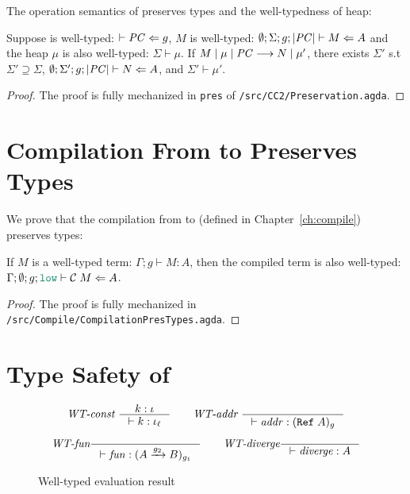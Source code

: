 The operation semantics of \CC preserves types and the well-typedness of heap:

\begin{theorem}[Preservation]
\label{thm:preservation}
Suppose \PC is well-typed:  $\vdash \mathit{PC} \Leftarrow g$,
$M$ is well-typed: $\emptyset ; \Sigma ; g ; |\mathit{PC}| \vdash M \Leftarrow A$
and the heap $\mu$ is also well-typed: $\Sigma \vdash \mu$.
If ${M}\mid{\mu}\mid{\ensuremath{\mathit{PC}}}\longrightarrow{N}\mid{\mu'}$, there exists $\Sigma'$ s.t
$\Sigma' \supseteq \Sigma$, $\emptyset ; \Sigma' ; g ; |\mathit{PC}| \vdash N \Leftarrow A$,
and $\Sigma' \vdash \mu'$.
\end{theorem}
\begin{proof}
  The proof is fully mechanized in \texttt{pres} of \texttt{/src/CC2/Preservation.agda}.
\end{proof}

\section{Compilation From \CC to \Surface Preserves Types}
\label{sec:compile-pres}

We prove that the compilation from \Surface to \CC (defined in
Chapter~\ref{ch:compile}) preserves types:

\begin{theorem}
  \label{thm:compile-pres}
  If $M$ is a well-typed \Surface term: $\Gamma ; g \vdash M : A$, then the
  compiled \CC term is also well-typed: $\Gamma ; \emptyset ; g ; \low \vdash
  \compile{M} \Leftarrow A$.
\end{theorem}
\begin{proof}
  The proof is fully mechanized in
  \texttt{/src/Compile/CompilationPresTypes.agda}.
\end{proof}

\section{Type Safety of \Surface}
\label{sec:surface-type-safety}

\begin{figure}[tbp]
  \raggedright
  \begin{gather*}
    \textit{WT-const}~
    \inference{k : \iota}{\vdash k : \iota_{\ell}}
    \qquad
    \textit{WT-addr}~
    \inference{}{\vdash \mathit{addr} : (\Refer{A})_{g}}
    \\[1ex]
    \textit{WT-fun}
    \inference{}{\vdash \mathit{fun} : (\Fun{A}{g_2}{B})_{g_1}}
    \qquad
    \textit{WT-diverge}
    \inference{}{\vdash \mathit{diverge} : A}
  \end{gather*}
  \caption{Well-typed evaluation result}
  \label{fig:wt-result}
\end{figure}


